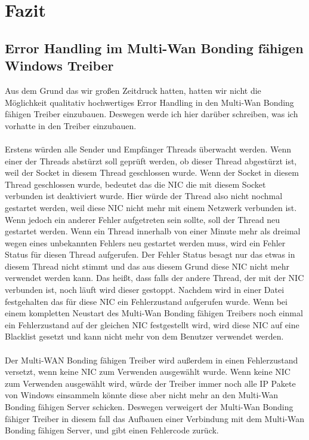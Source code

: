 \chapter{Fazit}
\label{cha:Fazit}
\section{Error Handling im Multi-Wan Bonding fähigen Windows Treiber}
Aus dem Grund das wir großen Zeitdruck hatten, hatten wir nicht die Möglichkeit qualitativ hochwertiges Error Handling in den Multi-Wan Bonding fähigen Treiber einzubauen. Deswegen werde ich hier darüber schreiben, was ich vorhatte in den Treiber einzubauen.
\\\\
Erstens würden alle Sender und Empfänger Threads überwacht werden. Wenn einer der Threads abstürzt soll geprüft werden, ob dieser Thread abgestürzt ist, weil der Socket in diesem Thread geschlossen wurde. Wenn der Socket in diesem Thread geschlossen wurde, bedeutet das die NIC die mit diesem Socket verbunden ist deaktiviert wurde. Hier würde der Thread also nicht nochmal gestartet werden, weil diese NIC nicht mehr mit einem Netzwerk verbunden ist. Wenn jedoch ein anderer Fehler aufgetreten sein sollte, soll der Thread neu gestartet werden. Wenn ein Thread innerhalb von einer Minute mehr als dreimal wegen eines unbekannten Fehlers neu gestartet werden muss, wird ein Fehler Status für diesen Thread aufgerufen. Der Fehler Status besagt nur das etwas in diesem Thread nicht stimmt und das aus diesem Grund diese NIC nicht mehr verwendet werden kann. Das heißt, dass falls der andere Thread, der mit der NIC verbunden ist, noch läuft wird dieser gestoppt. Nachdem wird in einer Datei festgehalten das für diese NIC ein Fehlerzustand aufgerufen wurde. Wenn bei einem kompletten Neustart des Multi-Wan Bonding fähigen Treibers noch einmal ein Fehlerzustand auf der gleichen NIC festgestellt wird, wird diese NIC auf eine Blacklist gesetzt und kann nicht mehr von dem Benutzer verwendet werden.
\\\\
Der Multi-WAN Bonding fähigen Treiber wird außerdem in einen Fehlerzustand versetzt, wenn keine NIC zum Verwenden ausgewählt wurde. Wenn keine NIC zum Verwenden ausgewählt wird, würde der Treiber immer noch alle IP Pakete von Windows einsammeln könnte diese aber nicht mehr an den Multi-Wan Bonding fähigen Server schicken. Deswegen verweigert der Multi-Wan Bonding fähiger Treiber in diesem fall das Aufbauen einer Verbindung mit dem Multi-Wan Bonding fähigen Server, und gibt einen Fehlercode zurück.